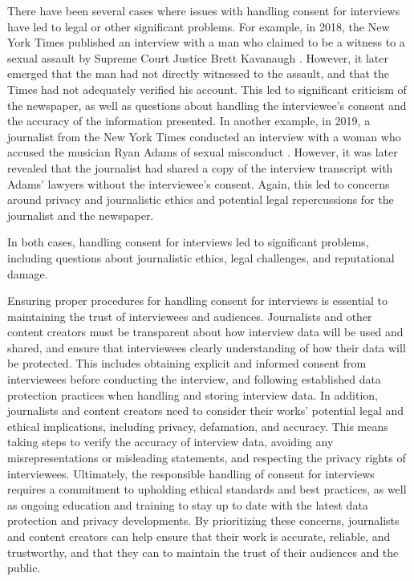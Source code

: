 \documentclass[target=mst,aauheader=]{thud}
\begin{document}
There have been several cases where issues with handling consent for interviews have led to legal or other significant problems. For example, in 2018, the New York Times published an interview with a man who claimed to be a witness to a sexual assault by Supreme Court Justice Brett Kavanaugh \cite{accusationBrettKavanaugh}. However, it later emerged that the man had not directly witnessed to the assault, and that the Times had not adequately verified his account. This led to significant criticism of the newspaper, as well as questions about handling the interviewee's consent and the accuracy of the information presented.
In another example, in 2019, a journalist from the New York Times conducted an interview with a woman who accused the musician Ryan Adams of sexual misconduct \cite{accusationRyanAdams}. However, it was later revealed that the journalist had shared a copy of the interview transcript with Adams' lawyers without the interviewee's consent. Again, this led to concerns around privacy and journalistic ethics and potential legal repercussions for the journalist and the newspaper.\par
In both cases, handling consent for interviews led to significant problems, including questions about journalistic ethics, legal challenges, and reputational damage.\par
Ensuring proper procedures for handling consent for interviews is essential to maintaining the trust of interviewees and audiences. Journalists and other content creators must be transparent about how interview data will be used and shared, and ensure that interviewees clearly understanding of how their data will be protected. This includes obtaining explicit and informed consent \cite{informedConsent} from interviewees before conducting the interview, and following established data protection practices when handling and storing interview data.
In addition, journalists and content creators need to consider their works' potential legal and ethical implications, including privacy, defamation, and accuracy. This means taking steps to verify the accuracy of interview data, avoiding any misrepresentations or misleading statements, and respecting the privacy rights of interviewees.
Ultimately, the responsible handling of consent for interviews requires a commitment to upholding ethical standards and best practices, as well as ongoing education and training to stay up to date with the latest data protection and privacy developments. By prioritizing these concerns, journalists and content creators can help ensure that their work is accurate, reliable, and trustworthy, and that they can to maintain the trust of their audiences and the public.
\end{document}
